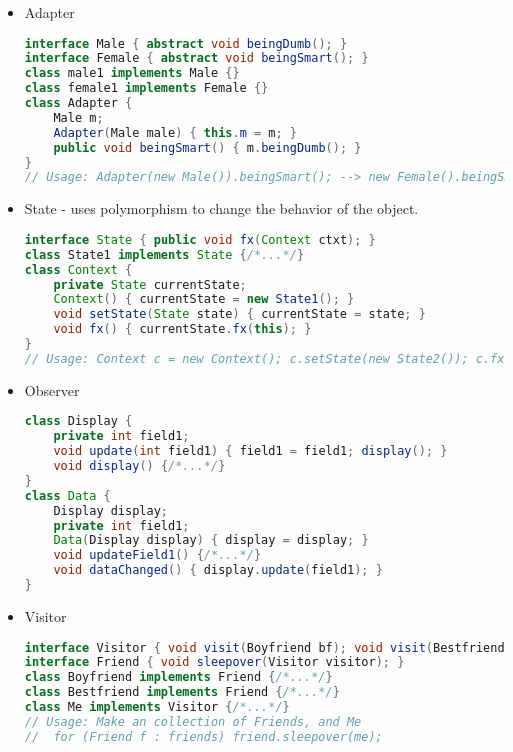 \documentclass[10pt]{article}
\begin{document}
\begin{itemize}
\begin{comment}
    \item Prototype
\begin{lstlisting}[language=java]
abstract class Item implements Cloneable {
    protected String itemName;
    abstract void addItem();
    public Object clone() {
        try {
            return super.clone();
        } catch (CloneNotSupporteException e) {
            e.printStackTrace();
        }
        return null;
    }
}
class Item1 extends Item {/*...*/}
class ItemStore {
    Map<String, Item> protoMap = new HashMap<>();
    static { protoMap.put("Item1", new Item1()); }
    public static Prototype getItem(String item) {
        return (Item) protoMap.get(item).clone();
    }
}
\end{lstlisting}
\end{comment}
    \item Adapter
\begin{lstlisting}[language=java]
interface Male { abstract void beingDumb(); }
interface Female { abstract void beingSmart(); }
class male1 implements Male {}
class female1 implements Female {}
class Adapter {
    Male m;
    Adapter(Male male) { this.m = m; }
    public void beingSmart() { m.beingDumb(); }
}
// Usage: Adapter(new Male()).beingSmart(); --> new Female().beingSmart();
\end{lstlisting}
    \item State - uses polymorphism to change the behavior of the object.
\begin{lstlisting}[language=java]
interface State { public void fx(Context ctxt); }
class State1 implements State {/*...*/}
class Context {
    private State currentState;
    Context() { currentState = new State1(); }
    void setState(State state) { currentState = state; }
    void fx() { currentState.fx(this); }
}
// Usage: Context c = new Context(); c.setState(new State2()); c.fx();
\end{lstlisting}
    \item Observer
\begin{lstlisting}[language=java]
class Display {
    private int field1;
    void update(int field1) { field1 = field1; display(); }
    void display() {/*...*/}
}
class Data {
    Display display;
    private int field1;
    Data(Display display) { display = display; }
    void updateField1() {/*...*/}
    void dataChanged() { display.update(field1); }
}
\end{lstlisting}
    \item Visitor
\begin{lstlisting}[language=java]
interface Visitor { void visit(Boyfriend bf); void visit(Bestfriend f); }
interface Friend { void sleepover(Visitor visitor); }
class Boyfriend implements Friend {/*...*/}
class Bestfriend implements Friend {/*...*/}
class Me implements Visitor {/*...*/}
// Usage: Make an collection of Friends, and Me
//  for (Friend f : friends) friend.sleepover(me);
\end{lstlisting}
\end{itemize}
\end{document}
